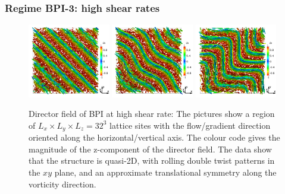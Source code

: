 \documentclass[8.5pt,twoside,twocolumn]{article}
\newcommand{\e}[1]{\times10^{#1}}
\newcommand{\gd}{\dot{\gamma}}
\newif\ifold
\begin{document}
{\subsubsection{Regime BPI-3: high shear rates }

\ifold At high flow rates, $6.25\e{-4}\lesssim\gd\lesssim7.81\e{-4}$ ($10.67\lesssim {\it Er}\lesssim 13.33$), 
we observe a break-up of the flow-induced 
disclination network of regime BPI-2. However, 
in contrast to BPII, where the configuration is a travelling helical 
wave (cf. Fig. \ref{bp2-high}), BPI breaks down into a quasi 
two-dimensional, translationally invariant state, which is shown in 
Fig. \ref{bp1-high}. 
There are distinctive regions where the director field is 
predominantly oriented along the vorticity direction and 
other regions where it is oriented rather in flow-gradient plane. 
Occasionally, while moving past each other, these rolls resemble 
regions of local double twist.
Interestingly the critical Ericksen number for the break-up lies in 
about the same window as that of transition between BPII-1 and BPII-2. 
\fi

\begin{figure}[htpb]
\includegraphics[width=0.32\textwidth]{dir3d+y-450k_run916r.png}
\includegraphics[width=0.32\textwidth]{dir3d+y-510k_run916r.png}
\includegraphics[width=0.32\textwidth]{dir3d+y-800k_run916r.png}
\caption{Director field of BPI at high shear rate: The pictures show a region 
of $L_x\times L_y \times L_z= 32^3$ lattice sites with the flow/gradient 
direction oriented along the horizontal/vertical axis. 
The colour code gives the magnitude of the z-component of the director field. 
The data show that the structure is quasi-2D, with rolling double twist
patterns in the $xy$ plane, and an approximate translational symmetry 
along the vorticity direction.}
\label{bp1-high}
\end{figure}


}
\end{document}
